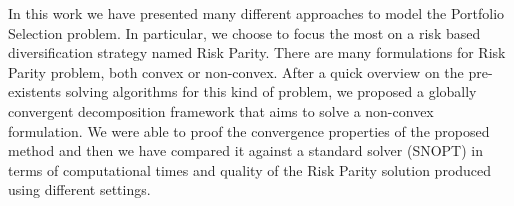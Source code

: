In this work we have presented many different approaches to model the Portfolio Selection problem. In particular, we choose to focus the most on a risk based diversification strategy named Risk Parity. There are many formulations for Risk Parity problem, both convex or non-convex. After a quick overview on the pre-existents solving algorithms for this kind of problem, we proposed a globally convergent decomposition framework that aims to solve a non-convex formulation. We were able to proof the convergence properties of the proposed method and then we have compared it against a standard solver (SNOPT) in terms of computational times and quality of the Risk Parity solution produced using different settings. 
